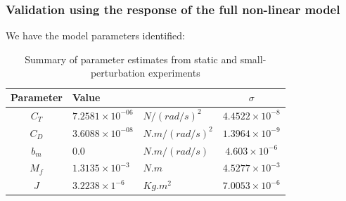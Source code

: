 \subsubsection{Validation using the response of the full non-linear model}
We have the model parameters identified:

\begin{table}[H]
    \centering
    \begin{tabular}{c l l c}
        \hline \hline
        Parameter & Value & & $\sigma$            \\ \hline \hline
        $C_T$ & $7.2581 \times 10^{-06}$ & $N/(rad/s)^2$   & $4.4522 \times 10^{-8}$ \\
        $C_D$ & $3.6088 \times 10^{-08}$ & $N.m/(rad/s)^2$ & $1.3964 \times 10^{-9}$ \\
        $b_m$ & $0.0$                    & $N.m/(rad/s)$   & $4.603 \times 10^{-6}$  \\
        $M_f$ & $1.3135 \times 10^{-3}$  & $N.m$           & $4.5277 \times 10^{-3}$ \\
        $J$   & $3.2238 \times 1^{-6}$   & $Kg.m^2$        & $7.0053 \times 10^{-6}$ \\
        \hline \hline
    \end{tabular}
    \caption{Summary of parameter estimates from static and small-perturbation experiments}
    \label{tab::parm_ests}
\end{table}

